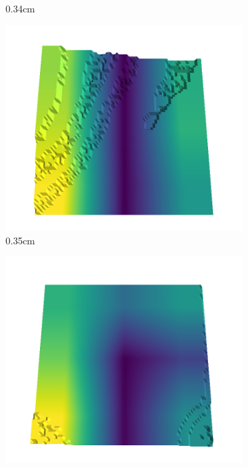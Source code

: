 \documentclass[../document.tex]{subfiles}
\begin{document}
\begin{figure}[H]
\begin{subfigure}[b]{0.242\linewidth}
    \caption{0.34cm}
    \end{subfigure}
    \begin{subfigure}[b]{0.242\linewidth}
    \includegraphics[width=\linewidth]{../img/5/quarry/best/50-patch-3d-majavi-colormap-40.png}
    \caption{0.35cm}
    \end{subfigure}
    \begin{subfigure}[b]{0.242\linewidth}
    \includegraphics[width=\linewidth]{../img/5/quarry/best/51-patch-3d-majavi-colormap-45.png}

\end{subfigure}
\end{figure}
\end{document}
